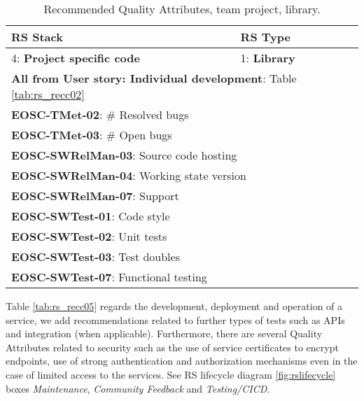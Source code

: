 \begin{center}
\begin{table}
  \small
  \begin{tabular}{|p{0.65\linewidth}|p{0.35\linewidth}|} \hline

    \textbf{RS Stack} & \textbf{RS Type} \\ \hline \hline
    4: \textbf{Project specific code} &
    1: \textbf{Library} \\ \hline \hline
    \multicolumn{2}{|l|}{\textbf{All from User story: Individual development}: Table \ref{tab:rs_recc02}} \\ \hline
    \multicolumn{2}{|l|}{\textbf{EOSC-TMet-02}: \# Resolved bugs} \\ \hline
    \multicolumn{2}{|l|}{\textbf{EOSC-TMet-03}: \# Open bugs} \\ \hline
    \multicolumn{2}{|l|}{\textbf{EOSC-SWRelMan-03}: Source code hosting} \\ \hline
    \multicolumn{2}{|l|}{\textbf{EOSC-SWRelMan-04}: Working state version} \\ \hline
    \multicolumn{2}{|l|}{\textbf{EOSC-SWRelMan-07}: Support} \\ \hline
    \multicolumn{2}{|l|}{\textbf{EOSC-SWTest-01}: Code style} \\ \hline
    \multicolumn{2}{|l|}{\textbf{EOSC-SWTest-02}: Unit tests} \\ \hline
    \multicolumn{2}{|l|}{\textbf{EOSC-SWTest-03}: Test doubles} \\ \hline
    \multicolumn{2}{|l|}{\textbf{EOSC-SWTest-07}: Functional testing} \\ \hline

  \end{tabular}
  \caption{Recommended Quality Attributes, team project, library.}
  \label{tab:rs_recc04}
\end{table}
\end{center}

Table \ref{tab:rs_recc05} regards the development, deployment and operation of a service, we add recommendations related to further types of tests such as APIs and integration (when applicable). Furthermore, there are several Quality Attributes related to security such as the use of service certificates to encrypt endpoints, use of strong authentication and authorization mechanisms even in the case of limited access to the services. See RS lifecycle diagram \ref{fig:rslifecycle} boxes \textit{Maintenance}, \textit{Community Feedback} and \textit{Testing/CICD}.

